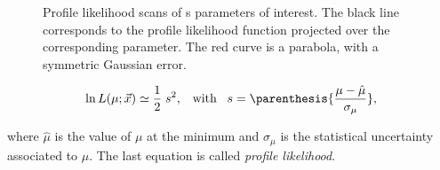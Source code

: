 \begin{figure}[!t]
  \centering
  \begin{subfigure}{0.5\textwidth}
    \scalebox{0.56}{}
    \caption{}
    \label{nll_ACP0}
  \end{subfigure}%
  \hfill%
  \begin{subfigure}{0.5\textwidth}
    \scalebox{0.57}{}
    \caption{}
    \label{nll_ACPperp}
  \end{subfigure}
  \begin{subfigure}{0.5\textwidth}
    \scalebox{0.56}{}
    \caption{}
    \label{nll_ACPpar}
  \end{subfigure}%
  \hfill%
  \begin{subfigure}{0.5\textwidth}
    \scalebox{0.56}{}
    \caption{}
    \label{nll_ACPS}
  \end{subfigure}
\caption{Profile likelihood scans of \Acp{} parameters of interest. The black line corresponds to the profile likelihood
         function projected over the corresponding parameter. The red curve is a parabola, with a symmetric Gaussian
         error.}
\end{figure}

\begin{equation}
\ln L(\mu;\vec{x}) \simeq \frac{1}{2} \; s^2, \;\;\; \text{with} \;\;\; s = \parenthesis{\frac{\mu-\hat{\mu}}{\sigma_{\mu}}},
\label{likelihood_exp}
\end{equation}

\noindent where $\hat{\mu}$ is the value of $\mu$ at the minimum and $\sigma_{\mu}$ is the statistical uncertainty associated
to $\mu$. The last equation is called {\it profile likelihood}.


